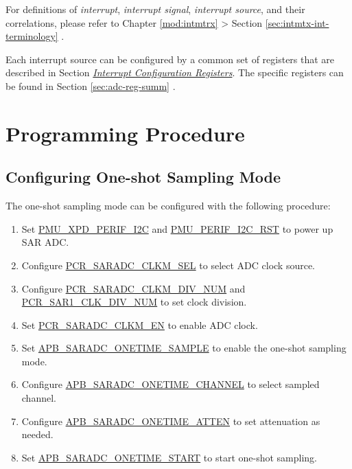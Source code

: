 \documentclass[main\_\_EN.tex]{subfiles}
\begin{document}
\begin{tiplisting}
For definitions of \textit{interrupt}, \textit{interrupt signal}, \textit{interrupt source}, and their correlations, please refer to Chapter \ref{mod:intmtrx} \textit{} > Section \ref{sec:intmtx-int-terminology} \textit{}.
\end{tiplisting}

Each interrupt source can be configured by a common set of registers that are described in Section \hyperref[interrupt-config-registers]{\textit{Interrupt Configuration Registers}}. The specific registers can be found in Section \ref{sec:adc-reg-summ} \textit{}.



\section{Programming Procedure}
\label{sec:adc_programming_procedure}

\subsection{Configuring One-shot Sampling Mode}

The one-shot sampling mode can be configured with the following procedure:

\begin{enumerate}
    \item Set \hyperref[fielddesc:PMUXPDPERIFI2C]{PMU\_XPD\_PERIF\_I2C} and \hyperref[fielddesc:PMUPERIFI2CRST]{PMU\_PERIF\_I2C\_RST} to power up SAR ADC.
    \item Configure \hyperref[fielddesc:PCRSARADCCLKMSEL]{PCR\_SARADC\_CLKM\_SEL} to select ADC clock source.
    \item Configure \hyperref[fielddesc:PCRSARADCCLKMDIVNUM]{PCR\_SARADC\_CLKM\_DIV\_NUM} and \hyperref[fielddesc:PCRSAR1CLKDIVNUM]{PCR\_SAR1\_CLK\_DIV\_NUM} to set clock division.
    \item Set \hyperref[fielddesc:PCRSARADCCLKMEN]{PCR\_SARADC\_CLKM\_EN} to enable ADC clock.
    \item Set \hyperref[fielddesc:APBSARADCONETIMESAMPLE]{APB\_SARADC\_ONETIME\_SAMPLE} to enable the one-shot sampling mode.
    \item Configure \hyperref[fielddesc:APBSARADCONETIMECHANNEL]{APB\_SARADC\_ONETIME\_CHANNEL} to select sampled channel.
    \item Configure \hyperref[fielddesc:APBSARADCONETIMEATTEN]{APB\_SARADC\_ONETIME\_ATTEN} to set attenuation as needed.
    \item Set \hyperref[fielddesc:APBSARADCONETIMESTART]{APB\_SARADC\_ONETIME\_START} to start one-shot sampling.
\end{enumerate}
\end{document}
